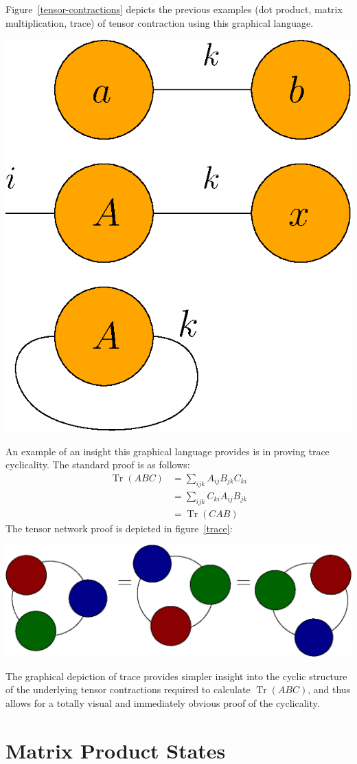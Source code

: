 \documentclass[12pt]{article}
\DeclareMathOperator{\Tr}{Tr}
\newenvironment{Figure}
  {\par\medskip\noindent\minipage{\linewidth}}
  {\endminipage\par\medskip}
\begin{document}
\begin{multicols}{2}
	Figure~\ref{tensor-contractions} depicts the previous examples (dot
	product, matrix multiplication, trace) of tensor contraction using
	this graphical language.
	\begin{Figure}
		\center\includegraphics[width=.5\textwidth]{./Figures/contractions.eps}
		\label{tensor-contractions}
	\end{Figure}
	An example of an insight this graphical language provides is in
	proving trace cyclicality. The standard proof is as follows:
	\begin{align*}
		\Tr(ABC)&=\sum_{ijk}A_{ij}B_{jk}C_{ki}\\
						&=\sum_{ijk}C_{ki}A_{ij}B_{jk}\\
						&=\Tr(CAB)
	\end{align*}
	The tensor network proof is depicted in figure~\ref{trace}:
	\begin{Figure}
		\center\includegraphics[width=.8\textwidth]{./Figures/trace.eps}
		\label{trace}
	\end{Figure}
	The graphical depiction of trace provides simpler insight into the
	cyclic structure of the underlying tensor contractions required to
	calculate $\Tr(ABC)$, and thus allows for a totally visual and
	immediately obvious proof of the cyclicality.
\section*{Matrix Product States}

\end{multicols}
\end{document}
